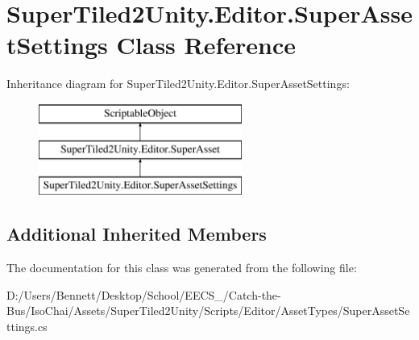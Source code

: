 \hypertarget{class_super_tiled2_unity_1_1_editor_1_1_super_asset_settings}{}\section{Super\+Tiled2\+Unity.\+Editor.\+Super\+Asset\+Settings Class Reference}
\label{class_super_tiled2_unity_1_1_editor_1_1_super_asset_settings}
Inheritance diagram for Super\+Tiled2\+Unity.\+Editor.\+Super\+Asset\+Settings\+:\begin{figure}[H]
\begin{center}
\leavevmode
\includegraphics[height=3.000000cm]{class_super_tiled2_unity_1_1_editor_1_1_super_asset_settings}
\end{center}
\end{figure}
\subsection*{Additional Inherited Members}


The documentation for this class was generated from the following file\+:\begin{DoxyCompactItemize}
\item 
D\+:/\+Users/\+Bennett/\+Desktop/\+School/\+E\+E\+C\+S\+\_/\+Catch-\/the-\/\+Bus/\+Iso\+Chai/\+Assets/\+Super\+Tiled2\+Unity/\+Scripts/\+Editor/\+Asset\+Types/Super\+Asset\+Settings.\+cs\end{DoxyCompactItemize}
